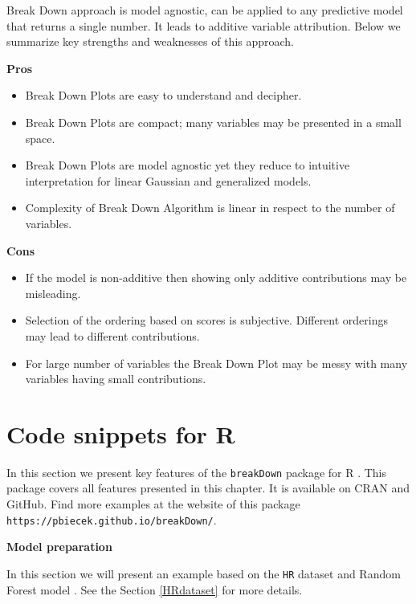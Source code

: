 \documentclass[]{book}
\providecommand{\tightlist}{%
  \setlength{\itemsep}{0pt}\setlength{\parskip}{0pt}}
\theoremstyle{definition}
\theoremstyle{definition}
\theoremstyle{definition}
\theoremstyle{remark}
\begin{document}
Break Down approach is model agnostic, can be applied to any predictive
model that returns a single number. It leads to additive variable
attribution. Below we summarize key strengths and weaknesses of this
approach.

\textbf{Pros}

\begin{itemize}
\tightlist
\item
  Break Down Plots are easy to understand and decipher.
\item
  Break Down Plots are compact; many variables may be presented in a
  small space.
\item
  Break Down Plots are model agnostic yet they reduce to intuitive
  interpretation for linear Gaussian and generalized models.
\item
  Complexity of Break Down Algorithm is linear in respect to the number
  of variables.
\end{itemize}

\textbf{Cons}

\begin{itemize}
\tightlist
\item
  If the model is non-additive then showing only additive contributions
  may be misleading.
\item
  Selection of the ordering based on scores is subjective. Different
  orderings may lead to different contributions.
\item
  For large number of variables the Break Down Plot may be messy with
  many variables having small contributions.
\end{itemize}

\hypertarget{code-snippets-for-r}{%
\section{Code snippets for R}\label{code-snippets-for-r}}

In this section we present key features of the \texttt{breakDown}
package for R \citep{R-breakDown}. This package covers all features
presented in this chapter. It is available on CRAN and GitHub. Find more
examples at the website of this package
\texttt{https://pbiecek.github.io/breakDown/}.

\textbf{Model preparation}

In this section we will present an example based on the \texttt{HR}
dataset and Random Forest model \citep{R-randomForest}. See the Section
\ref{HRdataset} for more details.
\end{document}
